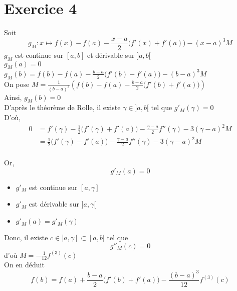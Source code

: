 \part{Exercice 4}

Soit \[
	g_M: x\mapsto f(x) - f(a) - \frac{x-a}{2}\big(f'(x) + f'(a)\big) - (x-a)^3M
\] 
$g_M$ est continue sur $[a,b]$ et dérivable sur $]a,b[$ \\
$g_M(a) = 0$ \\
$g_M(b) = f(b) - f(a) - \frac{b-a}{2}\big(f'(b) - f'(a)\big) - (b-a)^3M$ \\
On pose $M = \frac{1}{(b-a)^3}\left( f(b) - f(a) - \frac{b-a}{2} \big(f'(b) + f'(a)\big) \right) $ \\
Ainsi, $g_M (b) = 0$\\
D'après le théorème de Rolle, il existe $\gamma \in ]a,b[$ tel que $g'_M(\gamma) = 0$ \\
D'où, 
\begin{align*}
	0 
	&= f'(\gamma) - \frac{1}{2}\big(f'(\gamma) + f'(a)\big) - \frac{\gamma - a}{2}f''(\gamma) - 3 (\gamma-a)^2M\\
	&= \frac{1}{2}\big(f'(\gamma)  -f'(a)\big) - \frac{\gamma-a}{2}f''(\gamma) - 3(\gamma - a) ^2M \\
\end{align*}

Or, \[
	g'_M(a) = 0
\]
\begin{itemize}
	\item $g'_M$ est continue sur $[a,\gamma]$
	\item $g'_M$ est dérivable sur $]a,\gamma[$ 
	\item $g'_M(a) = g'_M(\gamma)$
\end{itemize}
Donc, il existe $c \in ]a,\gamma[ \subset ]a,b[$ tel que \[
	g''_M(c) = 0
\] d'où $M = -\frac{1}{12} f^{(3)}(c)$ \\
On en déduit \[
	f(b) = f(a) + \frac{b-a}{2}\big(f'(b) + f'(a) \big) - \frac{(b-a)^3}{12} f^{(3)}(c)
\]


